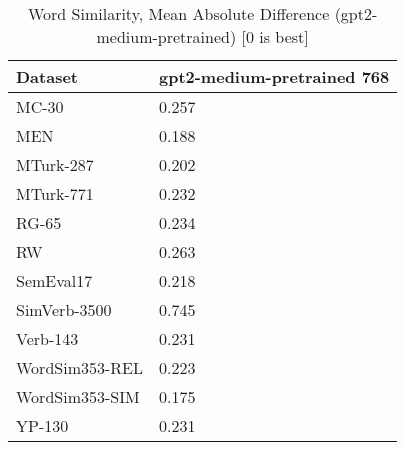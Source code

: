 \begin{table}[]
\centering
\begin{tabular}{l|l}
\hline
Dataset & gpt2-medium-pretrained 768 \\
\hline
MC-30 & 0.257 \\ 
MEN & 0.188 \\ 
MTurk-287 & 0.202 \\ 
MTurk-771 & 0.232 \\ 
RG-65 & 0.234 \\ 
RW & 0.263 \\ 
SemEval17 & 0.218 \\ 
SimVerb-3500 & 0.745 \\ 
Verb-143 & 0.231 \\ 
WordSim353-REL & 0.223 \\ 
WordSim353-SIM & 0.175 \\ 
YP-130 & 0.231
\end{tabular}
\caption{Word Similarity, Mean Absolute Difference (gpt2-medium-pretrained) [0 is best]}
\label{tab:similarity-gpt2-medium-pretrained}
\end{table}
